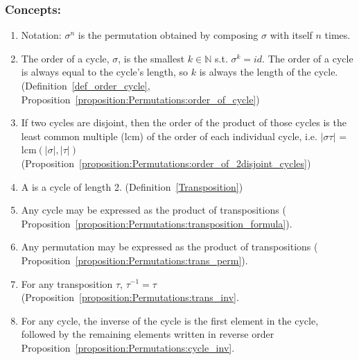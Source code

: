 \subsubsection*{Concepts:}
\begin{enumerate}
\item
Notation: $\sigma^n$ is the permutation obtained by composing $\sigma$ with itself $n$ times.
\item
The order of a cycle, $\sigma$, is the smallest $k \in {\mathbb N}$ s.t. $\sigma^k = id$.  The order of a cycle is always equal to the cycle's length, so $k$ is always the length of the cycle. (Definition~\ref{def_order_cycle}, Proposition~\ref{proposition:Permutations:order_of_cycle})
\item
If two cycles are disjoint, then the order of the product of those cycles is the least common multiple (lcm) of the order of each individual cycle, i.e. $|\sigma \tau|$ = lcm$(|\sigma|, |\tau|)$ (Proposition~\ref{proposition:Permutations:order_of_2disjoint_cycles})
\item
A  is a cycle of length 2. (Definition~\ref{Transposition})
\item
Any cycle may be expressed as the product of transpositions ( Proposition~\ref{proposition:Permutations:transposition_formula}).
\item
Any permutation may be expressed as the product of transpositions ( Proposition~\ref{proposition:Permutations:trans_perm}).
\item
For any transposition $\tau$, $\tau^{-1} = \tau$ (Proposition~\ref{proposition:Permutations:trans_inv}.
\item
For any cycle, the inverse of the cycle is the first element in the cycle, followed by the remaining elements written in reverse order Proposition~\ref{proposition:Permutations:cycle_inv}.
\end{enumerate}

